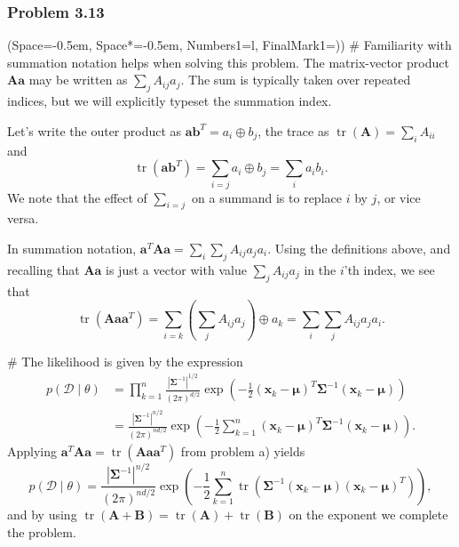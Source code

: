 \documentclass[12pt, a4paper]{article}
\newcommand{\listSpace}{-0.5em}%
\newcommand{\D}{\mathcal{D}}
\newcommand{\vect}[1]{\bm{#1}}
\newcommand{\abs}[1]{\left\lvert#1\right\rvert}
\begin{document}
\subsubsection*{Problem 3.13}
\begin{easylist}[enumerate]
\ListProperties(Space=\listSpace, Space*=\listSpace, Numbers1=l, FinalMark1={)})
# Familiarity with summation notation helps when solving this problem.
The matrix-vector product $\vect{A}\vect{a}$ may be written as $\sum_j A_{ij} a_j$.
The sum is typically taken over repeated indices, but we will explicitly typeset the summation index.

Let's write the outer product as $\vect{a}\vect{b}^T = a_i \oplus b_j$, the trace as $\operatorname{tr}(\vect{A}) = \sum_i A_{ii}$ and
\begin{equation*}
	\operatorname{tr}(\vect{a}\vect{b}^T) = \sum_{i = j} a_i \oplus b_j = \sum_{i} a_i b_i.
\end{equation*}
We note that the effect of $\sum_{i = j}$ on a summand is to replace $i$ by $j$, or vice versa.

In summation notation, $\vect{a}^T \vect{A} \vect{a} = \sum_i \sum_j A_{ij} a_j a_i$.
Using the definitions above, and recalling that $\vect{A} \vect{a}$ is just a vector with value $\sum_j A_{ij} a_j$ in the $i$'th index, we see that
\begin{equation*}
	\operatorname{tr}( \vect{A} \vect{a} \vect{a}^T) = \sum_{i=k}  \left( \sum_j A_{ij} a_j \right) \oplus a_k = \sum_i \sum_j A_{ij} a_j a_i.
\end{equation*}

# The likelihood is given by the expression
\begin{align*}
	p(\D  \mid  \theta) &= \prod_{k=1}^{n} \frac{\abs{\vect{\Sigma}^{-1}}^{1/2}}{\left(2 \pi \right)^{d/2}} \exp \left( -\frac{1}{2} \left( \vect{x}_k - \vect{\mu} \right)^T  \vect{\Sigma}^{-1}  \left( \vect{x}_k - \vect{\mu} \right)\right) \\
	&=  \frac{\abs{\vect{\Sigma}^{-1}}^{n/2}}{\left(2 \pi \right)^{nd/2}} \exp \left( -\frac{1}{2}  \sum_{k=1}^{n} \left( \vect{x}_k - \vect{\mu} \right)^T  \vect{\Sigma}^{-1}  \left( \vect{x}_k - \vect{\mu} \right)\right).
\end{align*}
Applying $ \vect{a}^T \vect{A} \vect{a} = \operatorname{tr}( \vect{A} \vect{a} \vect{a}^T)$ from problem a) yields
\begin{equation*}
p(\D  \mid  \theta) = \frac{\abs{\vect{\Sigma}^{-1}}^{n/2}}{\left(2 \pi \right)^{nd/2}} \exp \left( -\frac{1}{2}  \sum_{k=1}^{n} 
\operatorname{tr} \left( \vect{\Sigma}^{-1} \left( \vect{x}_k - \vect{\mu} \right) \left( \vect{x}_k - \vect{\mu} \right)^T \right)
\right),
\end{equation*}
and by using $\operatorname{tr}\left(\vect{A} + \vect{B}\right) = \operatorname{tr}\left(\vect{A}\right) + \operatorname{tr}\left( \vect{B}\right)$ on the exponent we complete the problem.


\end{easylist}
\end{document}
